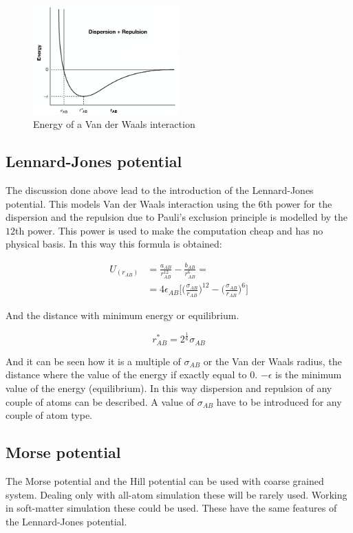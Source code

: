 	\begin{figure}[H]
		\centering
		\includegraphics[width=0.5\textwidth]{van-der-waals}
		\caption{Energy of a Van der Waals interaction}
		\label{fig:van-der-waals}
	\end{figure}

		\subsection{Lennard-Jones potential}
		The discussion done above lead to the introduction of the Lennard-Jones potential.
		This models Van der Waals interaction using the $6$th power for the dispersion and the repulsion due to Pauli's exclusion principle is modelled by the $12$th power.
		This power is used to make the computation cheap and has no physical basis.
		In this way this formula is obtained:

		\begin{align*}
			U_(r_{AB}) &= \frac{a_{AB}}{r^{12}_{AB}}-\frac{b_{AB}}{r^6_{AB}}=\\
								 &= 4\epsilon_{AB}\biggl[\biggl(\frac{\sigma_{AB}}{r_{AB}}\biggr)^{12}-\biggl(\frac{\sigma_{AB}}{r_{AB}}\biggr)^6\biggr]
		\end{align*}

		And the distance with minimum energy or equilibrium.

		$$r^*_{AB} = 2^{\frac{1}{6}}\sigma_{AB}$$

		And it can be seen how it is a multiple of $\sigma_{AB}$ or the Van der Waals radius, the distance where the value of the energy if exactly equal to $0$.
		$-\epsilon$ is the minimum value of the energy (equilibrium).
		In this way dispersion and repulsion of any couple of atoms can be described.
		A value of $\sigma_{AB}$ have to be introduced for any couple of atom type.

		\subsection{Morse potential}
		The Morse potential and the Hill potential can be used with coarse grained system.
		Dealing only with all-atom simulation these will be rarely used.
		Working in soft-matter simulation these could be used.
		These have the same features of the Lennard-Jones potential.

